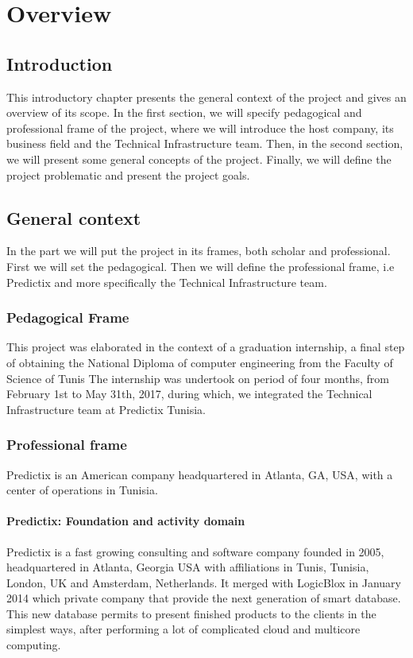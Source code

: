 \chapter{Overview}

\section*{Introduction}
This introductory chapter presents the general context of the project and gives
an overview of its scope. In the first section, we will specify pedagogical and
professional frame of the project, where we will introduce the host company, its
business field  and the Technical Infrastructure team. Then, in the second
section, we will present some general concepts of the project. Finally, we will
define the project problematic and present the project goals.

\pagebreak

\section{General context}
In the part we will put the project in its frames, both scholar and
professional. First we will set the pedagogical. Then we will define the
professional frame, i.e Predictix and more specifically the Technical
Infrastructure team.

\subsection{Pedagogical Frame}
This project was elaborated in the context of a graduation internship, a final
step of obtaining the National Diploma of computer engineering from the Faculty
of Science of Tunis
The internship was undertook on period of four months, from February 1st to
May 31th, 2017, during which, we integrated the Technical Infrastructure team at
Predictix Tunisia.
\subsection{Professional frame}

Predictix is an American company headquartered in Atlanta, GA, USA, with a
center of operations in Tunisia.
\subsubsection{Predictix: Foundation and activity domain}

Predictix is a fast growing consulting and software company founded in 2005,
headquartered in Atlanta, Georgia USA with affiliations in Tunis, Tunisia,
London, UK and Amsterdam, Netherlands. It merged with LogicBlox in January 2014
which private company that provide the next generation of smart database. This
new database permits to present finished products to the clients in the simplest
ways, after performing a lot of complicated cloud and multicore computing.

